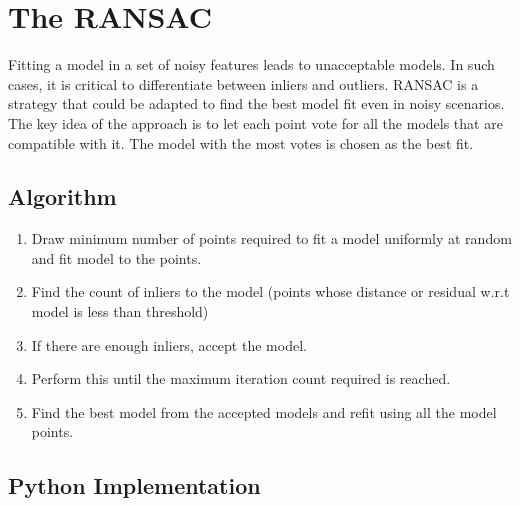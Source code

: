 \section{The RANSAC}
\vspace*{-.2cm}
Fitting a model in a set of noisy features leads to unacceptable models. In such cases, it is critical to differentiate between inliers and outliers. RANSAC is a strategy that could be adapted to find the best model fit even in noisy scenarios. The key idea of the approach is to let each point vote for all the models that are compatible with it. The model with the most votes is chosen as the best fit.
\vspace*{-.2cm}
\subsection*{Algorithm}
\vspace*{-.2cm}
\begin{enumerate}
    \item Draw minimum number of points required to fit a model uniformly at random and fit model to the points.
    \item Find the count of inliers to the model (points whose distance or residual w.r.t model is less than threshold)
    \item If there are enough inliers, accept the model.
    \item Perform this until the maximum iteration count required is reached.
    \item Find the best model from the accepted models and refit using all the model points.
\end{enumerate}
\vspace*{-.4cm}
\subsection*{Python Implementation}
\vspace*{-.2cm}
\vspace*{-.2cm}




